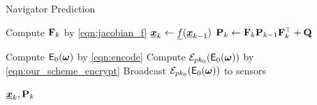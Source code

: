 \documentclass[twocolumn]{autart}
\begin{document}
\begin{algorithm}[htbp]
    \caption{Navigator Prediction}\label{alg:nav_prediction}
    \begin{algorithmic}[1]
    
        \State Compute ${{\mathbf{F}}}_k$ by \eqref{eqn:jacobian_f}
        \State ${\boldsymbol{\underline{x}}}_{k} \gets {\underline{f}}({\boldsymbol{\underline{x}}}_{k-1})$
        \State ${{\mathbf{P}}}_{k} \gets {\ensuremath{{\mathbf{F}}}}_k{{\mathbf{P}}}_{k-1}{{\mathbf{F}}}_k^\top + {{\mathbf{Q}}}$
    
            \State Compute $\mathsf{E}_{0}({\boldsymbol{\omega}})$ by \eqref{eqn:encode}
            \State Compute $\mathcal{E}_{pk_0}(\mathsf{E}_{0}({\boldsymbol{\omega}}))$ by \eqref{eqn:our_scheme_encrypt}
            \State Broadcast $\mathcal{E}_{pk_0}(\mathsf{E}_{0}({\boldsymbol{\omega}}))$ to sensors
        \EndFor
    
        \State \Return ${\boldsymbol{\underline{x}}}_{k}, {{\mathbf{P}}}_{k}$
        \EndProcedure
    \end{algorithmic}
    \end{algorithm}
\end{document}
